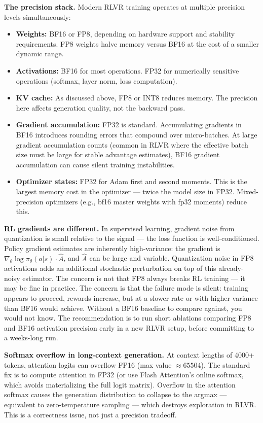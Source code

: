 \textbf{The precision stack.} Modern RLVR training operates at multiple precision levels simultaneously:
\begin{itemize}
  \item \textbf{Weights:} BF16 or FP8, depending on hardware support and stability requirements. FP8 weights halve memory versus BF16 at the cost of a smaller dynamic range.
  \item \textbf{Activations:} BF16 for most operations. FP32 for numerically sensitive operations (softmax, layer norm, loss computation).
  \item \textbf{KV cache:} As discussed above, FP8 or INT8 reduces memory. The precision here affects generation quality, not the backward pass.
  \item \textbf{Gradient accumulation:} FP32 is standard. Accumulating gradients in BF16 introduces rounding errors that compound over micro-batches. At large gradient accumulation counts (common in RLVR where the effective batch size must be large for stable advantage estimates), BF16 gradient accumulation can cause silent training instabilities.
  \item \textbf{Optimizer states:} FP32 for Adam first and second moments. This is the largest memory cost in the optimizer --- twice the model size in FP32. Mixed-precision optimizers (e.g., bf16 master weights with fp32 moments) reduce this.
\end{itemize}

\textbf{RL gradients are different.} In supervised learning, gradient noise from quantization is small relative to the signal --- the loss function is well-conditioned. Policy gradient estimates are inherently high-variance: the gradient is $\nabla_\theta \log \pi_\theta(a|s) \cdot \hat{A}$, and $\hat{A}$ can be large and variable. Quantization noise in FP8 activations adds an additional stochastic perturbation on top of this already-noisy estimator. The concern is not that FP8 always breaks RL training --- it may be fine in practice. The concern is that the failure mode is silent: training appears to proceed, rewards increase, but at a slower rate or with higher variance than BF16 would achieve. Without a BF16 baseline to compare against, you would not know. The recommendation is to run short ablations comparing FP8 and BF16 activation precision early in a new RLVR setup, before committing to a weeks-long run.

\textbf{Softmax overflow in long-context generation.} At context lengths of 4000+ tokens, attention logits can overflow FP16 (max value $\approx 65504$). The standard fix is to compute attention in FP32 (or use Flash Attention's online softmax, which avoids materializing the full logit matrix). Overflow in the attention softmax causes the generation distribution to collapse to the argmax --- equivalent to zero-temperature sampling --- which destroys exploration in RLVR. This is a correctness issue, not just a precision tradeoff.

